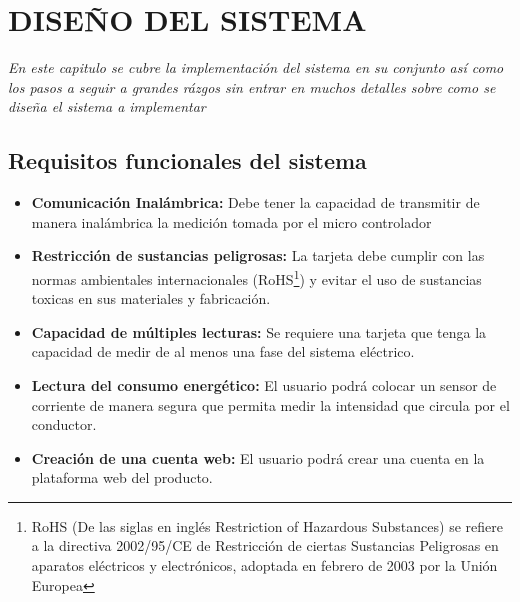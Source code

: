 

\chapter{ DISEÑO DEL SISTEMA }

\textit{En este capitulo se cubre la implementación del sistema en su conjunto así como los pasos a seguir a grandes rázgos sin entrar en muchos detalles sobre como se diseña el sistema a implementar }

\section{ Requisitos funcionales del sistema }

\begin{itemize}

\item \textbf{Comunicación Inalámbrica:} Debe tener la capacidad de transmitir de manera inalámbrica la medición tomada por el micro controlador

\item \textbf{Restricción de sustancias peligrosas:} La tarjeta debe cumplir con las normas ambientales internacionales (RoHS\footnote{RoHS (De las siglas en inglés Restriction of Hazardous Substances) se refiere a la directiva 2002/95/CE de Restricción de ciertas Sustancias Peligrosas en aparatos eléctricos y electrónicos, adoptada en febrero de 2003 por la Unión Europea}) y evitar el uso de sustancias toxicas en sus materiales y fabricación.
 
\item \textbf{Capacidad de múltiples lecturas:} Se requiere una tarjeta que tenga la capacidad de medir de al menos una fase del sistema eléctrico.

\item \textbf{Lectura del consumo energético:} El usuario podrá colocar un sensor de corriente de manera segura que permita medir la intensidad que circula por el conductor.

\item \textbf{Creación de una cuenta web:} El usuario podrá crear una cuenta en la plataforma web del producto.

\end{itemize}

